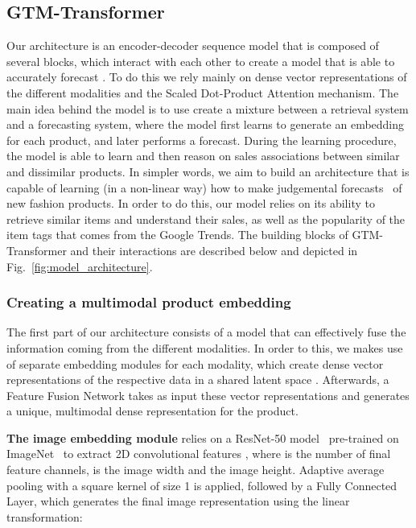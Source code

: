 \documentclass{article}
\newcommand{\approachname}[0] {GTM-Transformer\xspace}
\begin{document}
\subsection{\approachname{}}
Our architecture is an encoder-decoder sequence model \cite{sutskever2014} that is composed of several blocks, which interact with each other to create a model that is able to accurately forecast . To do this we rely mainly on dense vector representations of the different modalities and the Scaled Dot-Product Attention mechanism. The main idea behind the model is to use create a mixture between a retrieval system and a forecasting system, where the model first learns to generate an embedding for each product, and later performs a forecast. During the learning procedure, the model is able to learn and then reason on sales associations between similar and dissimilar products. In simpler words, we aim to build an architecture that is capable of learning (in a non-linear way) how to make judgemental forecasts~\cite{FPAP2} of new fashion products. In order to do this, our model relies on its ability to retrieve similar items and understand their sales, as well as the popularity of the item tags that comes from the Google Trends.  The building blocks of \approachname{} and their interactions are described below and depicted in Fig.~\ref{fig:model_architecture}.

\subsubsection{Creating a multimodal product embedding}
The first part of our architecture consists of a model that can effectively fuse the information coming from the different modalities. In order to this, we makes use of separate embedding modules for each modality, which create dense vector representations of the respective data in a shared latent space . Afterwards, a Feature Fusion Network takes as input these vector representations and generates a unique, multimodal dense representation for the product. 

\textbf{The image embedding module} relies on a ResNet-50 model~\cite{he2015deep} pre-trained on ImageNet~\cite{imagenet} to extract 2D convolutional features , where  is the number of final feature channels,  is the image width and  the image height. Adaptive average pooling \cite{Liu_2018_CVPR} with a square kernel of size 1 is applied, followed by a Fully Connected Layer, which generates the final image representation using the linear transformation: 
\end{document}
